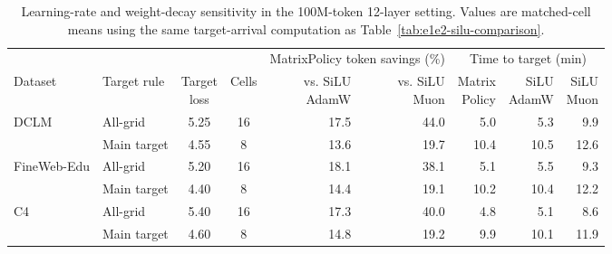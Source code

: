 \begin{table}[H]
\centering
\caption{Learning-rate and weight-decay sensitivity in the 100M-token 12-layer setting. Values are matched-cell means using the same target-arrival computation as Table~\ref{tab:e1e2-silu-comparison}.}
\label{tab:lr-wd-sensitivity}
\begingroup
\footnotesize
\setlength{\tabcolsep}{1.9pt}
\renewcommand{\arraystretch}{1.04}
\begin{tabular}{@{}llcc*{2}{r}@{\hspace{0.6em}}*{3}{r}@{}}
\toprule
& & & & \multicolumn{2}{c}{MatrixPolicy token savings (\%)} & \multicolumn{3}{c}{Time to target (min)} \\
\cmidrule(lr){5-6}\cmidrule(l){7-9}
Dataset & Target rule & \shortstack{Target\\loss} & Cells &
\shortstack{vs. SiLU\\AdamW} &
\shortstack{vs. SiLU\\Muon} &
\shortstack{Matrix\\Policy} &
\shortstack{SiLU\\AdamW} &
\shortstack{SiLU\\Muon} \\
\midrule
DCLM & All-grid & 5.25 & 16 & 17.5 & 44.0 & 5.0 & 5.3 & 9.9 \\
 & Main target & 4.55 & 8 & 13.6 & 19.7 & 10.4 & 10.5 & 12.6 \\
FineWeb-Edu & All-grid & 5.20 & 16 & 18.1 & 38.1 & 5.1 & 5.5 & 9.3 \\
 & Main target & 4.40 & 8 & 14.4 & 19.1 & 10.2 & 10.4 & 12.2 \\
C4 & All-grid & 5.40 & 16 & 17.3 & 40.0 & 4.8 & 5.1 & 8.6 \\
 & Main target & 4.60 & 8 & 14.8 & 19.2 & 9.9 & 10.1 & 11.9 \\
\bottomrule
\end{tabular}
\endgroup
\end{table}
